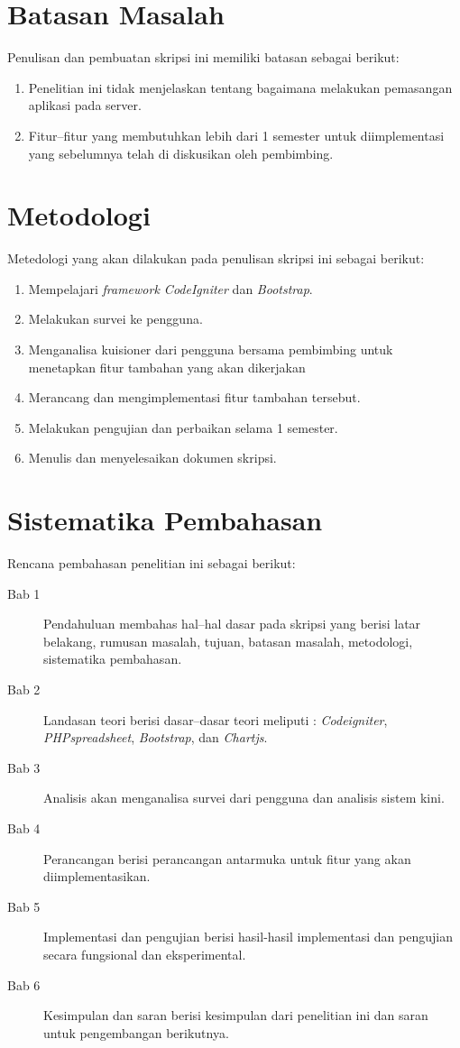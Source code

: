 \section{Batasan Masalah}
\label{sec:batasan}
Penulisan dan pembuatan skripsi ini memiliki batasan sebagai berikut:
\begin{enumerate}
	\item Penelitian ini tidak menjelaskan tentang bagaimana melakukan pemasangan aplikasi pada server.
	\item Fitur--fitur yang membutuhkan lebih dari 1 semester untuk diimplementasi yang sebelumnya telah di diskusikan oleh pembimbing.
	
\end{enumerate}


\section{Metodologi}
\label{sec:metlit}
Metedologi yang akan dilakukan pada penulisan skripsi ini sebagai berikut:

\begin{enumerate}
	\item Mempelajari \textit{framework CodeIgniter} dan \textit{Bootstrap}.
	\item Melakukan survei ke pengguna.
	\item Menganalisa kuisioner dari pengguna bersama pembimbing untuk menetapkan fitur tambahan yang akan dikerjakan
	\item Merancang dan mengimplementasi fitur tambahan tersebut.
	\item Melakukan pengujian dan perbaikan selama 1 semester.
	\item Menulis dan menyelesaikan dokumen skripsi.
\end{enumerate}

\section{Sistematika Pembahasan}
\label{sec:sispem}
Rencana pembahasan penelitian ini sebagai berikut:
\begin{description}
	\item[Bab 1] Pendahuluan membahas hal--hal dasar pada skripsi yang berisi latar belakang, rumusan masalah, tujuan, batasan masalah, metodologi, sistematika pembahasan.
	\item[Bab 2] Landasan teori berisi dasar--dasar teori meliputi : \textit{Codeigniter}, \textit{PHPspreadsheet}, \textit{Bootstrap}, dan \textit{Chartjs}.
	\item[Bab 3] Analisis akan menganalisa survei dari pengguna dan analisis sistem kini.
	\item[Bab 4] Perancangan berisi perancangan antarmuka untuk fitur yang akan diimplementasikan.  
	\item[Bab 5] Implementasi dan pengujian berisi hasil-hasil implementasi dan pengujian secara fungsional dan eksperimental.
	\item[Bab 6] Kesimpulan dan saran berisi kesimpulan dari penelitian ini dan saran untuk pengembangan berikutnya.
\end{description}
